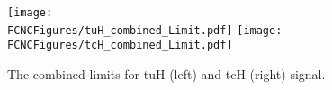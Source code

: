 \begin{figure}[htb]
\centering
\texttt{[image: \\FCNCFigures/tuH\_combined\_Limit.pdf]}
\texttt{[image: \\FCNCFigures/tcH\_combined\_Limit.pdf]}
\caption{ The combined limits for tuH (left) and tcH (right) signal. }
\label{fig:combined_limit}
\end{figure}
